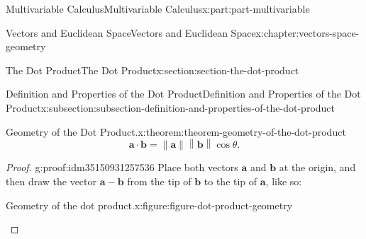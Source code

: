 \documentclass[twoside,10pt,]{book}
\numberwithin{equation}{part}
\newcommand{\norm}[1]{\left\| #1 \right\|}
\begin{document}
\begin{partptx}{Multivariable Calculus}{}{Multivariable Calculus}{}{}{x:part:part-multivariable}
\begin{chapterptx}{Vectors and Euclidean Space}{}{Vectors and Euclidean Space}{}{}{x:chapter:vectors-space-geometry}
\begin{sectionptx}{The Dot Product}{}{The Dot Product}{}{}{x:section:section-the-dot-product}
\begin{subsectionptx}{Definition and Properties of the Dot Product}{}{Definition and Properties of the Dot Product}{}{}{x:subsection:subsection-definition-and-properties-of-the-dot-product}
\begin{theorem}{Geometry of the Dot Product.}{}{x:theorem:theorem-geometry-of-the-dot-product}
%
\begin{equation*}
\mathbf{a}\cdot\mathbf{b} = \norm{\mathbf{a}}\norm{\mathbf{b}}\cos\theta.
\end{equation*}
\end{theorem}
\begin{proof}{}{g:proof:idm35150931257536}
Place both vectors \(\mathbf{a}\) and \(\mathbf{b}\) at the origin, and then draw the vector \(\mathbf{a}-\mathbf{b}\) from the tip of \(\mathbf{b}\) to the tip of \(\mathbf{a}\), like so:%
\begin{figureptx}{Geometry of the dot product.}{x:figure:figure-dot-product-geometry}{}%
\begin{image}{0.2}{0.6}{0.2}%
\end{image}
\end{figureptx}
\end{proof}
\end{subsectionptx}
\end{sectionptx}
\end{chapterptx}
\end{partptx}
\end{document}
